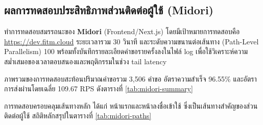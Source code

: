 \subsection{ผลการทดสอบประสิทธิภาพส่วนติดต่อผู้ใช้ (Midori)}
\label{sec:midori-perf}
\hspace*{1.3em}
ทำการทดสอบสมรรถนะของ \textbf{Midori} (Frontend/Next.js) โดยมีเป้าหมายการทดสอบคือ \url{https://dev.fitm.cloud} ระยะเวลารวม 30 วินาที และระดับความขนานต่อเส้นทาง (Path-Level Parallelism) 100 พร้อมทั้งบันทึกรายละเอียดคำขอรายครั้งลงในไฟล์ log เพื่อใช้วิเคราะห์ความสม่ำเสมอของเวลาตอบสนองและพฤติกรรมในช่วง tail latency

\hspace*{1.3em}
ภาพรวมของการทดสอบสะท้อนปริมาณคำขอรวม 3{,}506 คำขอ อัตราความสำเร็จ 96.55\% และอัตราการส่งผ่านโดยเฉลี่ย 109.67 RPS ดังตารางที่ \ref{tab:midori-summary}

\begin{table}[htbp]
    \centering
    \caption{}
    \fontSixTeen
    \label{tab:midori-summary}
\end{table}

\hspace*{1.3em}
การทดสอบครอบคลุมเส้นทางหลัก ได้แก่ หน้าแรกและหน้าลงชื่อเข้าใช้ ซึ่งเป็นเส้นทางสำคัญของส่วนติดต่อผู้ใช้ สถิติหลักสรุปในตารางที่ \ref{tab:midori-paths}

\begin{table}[htbp]
    \centering
    \caption{}
    \label{tab:midori-paths}
    \fontSixTeen
\end{table}

